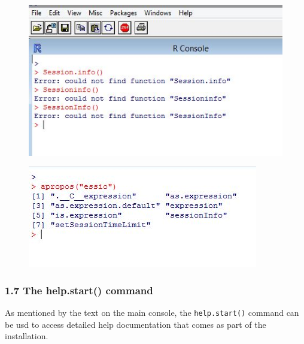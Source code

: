 \documentclass{beamer}
\begin{document}
 \begin{frame}
 	\begin{figure}
 		\centering
 		\includegraphics[width=0.7\linewidth]{images/Rapropos1}       
 	\end{figure}
 \end{frame}   
 \begin{frame}
 	\begin{figure}
 		\centering
 		\includegraphics[width=0.7\linewidth]{images/Rapropos2}       
 	\end{figure}
 \end{frame}   
 \begin{frame}
 	
 	
 	\frametitle{1.7 The help.start() command}
 	As mentioned by the text on the main console, the \texttt{help.start()} command can be usd to
 	access detailed help documentation that comes as part of the installation.
 \end{frame}
\end{document}
